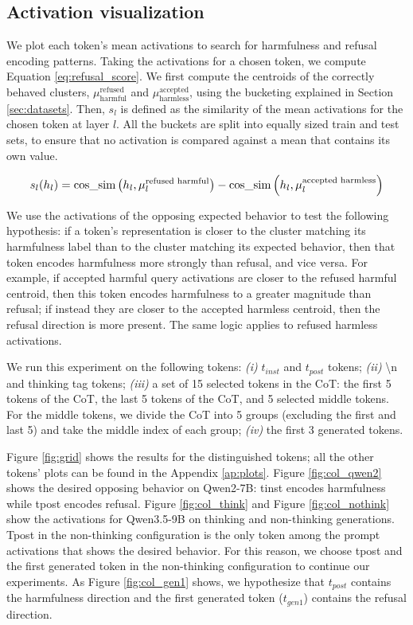 \documentclass[nohyperref]{article}
\theoremstyle{plain}
\theoremstyle{definition}
\theoremstyle{remark}
\begin{document}
\subsection{Activation visualization}
\label{sec:activations}

We plot each token's mean activations to search for harmfulness and refusal encoding patterns. Taking the activations for a chosen token, we compute Equation \ref{eq:refusal_score}. We first compute the centroids of the correctly behaved clusters, $\mu_{\text{harmful}}^{\text{refused}}$ and $\mu_{\text{harmless}}^{\text{accepted}}$, using the bucketing explained in Section \ref{sec:datasets}. Then, $s_l$ is defined as the similarity of the mean activations for the chosen token at layer $l$. All the buckets are split into equally sized train and test sets, to ensure that no activation is compared against a mean that contains its own value.


\begin{equation}
\resizebox{0.92\linewidth}{!}{$\displaystyle s_l(h_l) = \text{cos\_sim}\left(h_l, \mu_l^{\text{refused harmful}}\right) - \text{cos\_sim}\left(h_l, \mu_l^{\text{accepted harmless}}\right)$}
\label{eq:refusal_score}
\end{equation}

We use the activations of the opposing expected behavior to test the following hypothesis: if a token's representation is closer to the cluster matching its harmfulness label than to the cluster matching its expected behavior, then that token encodes harmfulness more strongly than refusal, and vice versa. For example, if accepted harmful query activations are closer to the refused harmful centroid, then this token encodes harmfulness to a greater magnitude than refusal; if instead they are closer to the accepted harmless centroid, then the refusal direction is more present. The same logic applies to refused harmless activations.

We run this experiment on the following tokens: \emph{(i)} $t_{inst}$ and $t_{post}$ tokens; \emph{(ii)} \textbackslash n and thinking tag tokens; \emph{(iii)} a set of 15 selected tokens in the CoT: the first 5 tokens of the CoT, the last 5 tokens of the CoT, and 5 selected middle tokens. For the middle tokens, we divide the CoT into 5 groups (excluding the first and last 5) and take the middle index of each group; \emph{(iv)} the first 3 generated tokens.

Figure \ref{fig:grid} shows the results for the distinguished tokens; all the other tokens' plots can be found in the Appendix \ref{ap:plots}. Figure \ref{fig:col_qwen2} shows the desired opposing behavior on Qwen2-7B: tinst encodes harmfulness while tpost encodes refusal. Figure \ref{fig:col_think} and Figure \ref{fig:col_nothink} show the activations for Qwen3.5-9B on thinking and non-thinking generations. Tpost in the non-thinking configuration is the only token among the prompt activations that shows the desired behavior. For this reason, we choose tpost and the first generated token in the non-thinking configuration to continue our experiments. As Figure \ref{fig:col_gen1} shows, we hypothesize that $t_{post}$ contains the harmfulness direction and the first generated token ($t_{gen1}$)  contains the refusal direction.
\end{document}
